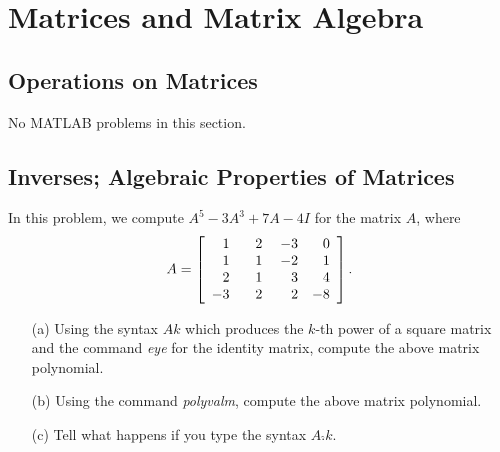 \chapter {Matrices and Matrix Algebra}

\section{Operations on Matrices}

No MATLAB problems in this section.


\section{Inverses; Algebraic Properties of Matrices}

\begin{exer}
In this problem, we compute $A^{5} - 3A^{3} + 7A - 4I$ for the matrix $A$, where
$$
A = \left[\begin{array}{rrrr} 1&\hspace{3mm} 2&\hspace{1mm} -3&\hspace{2mm} 0\\ 1 & 1 & -2 & 1 \\ 2 & 1 & 3 & 4 \\ -3 & 2 & 2 & -8 \end{array} \right].
$$
\begin{enumerate}

\vspace{2mm}
\item[(a)]  Using the syntax $A$\hspace{1mm}$\hat{}$\hspace{1mm}$k$ which produces the $k$-th power of a square matrix and the command \textit{eye} for the identity matrix, compute the above matrix polynomial.

\vspace{1mm}
\item[(b)]  Using the command \textit{polyvalm}, compute the above matrix polynomial.

\vspace{1mm}
\item[(c)]  Tell what happens if you type the syntax $A.$\hspace{1mm}$\hat{}$\hspace{1mm}$k$.

\end{enumerate}
\end{exer}

